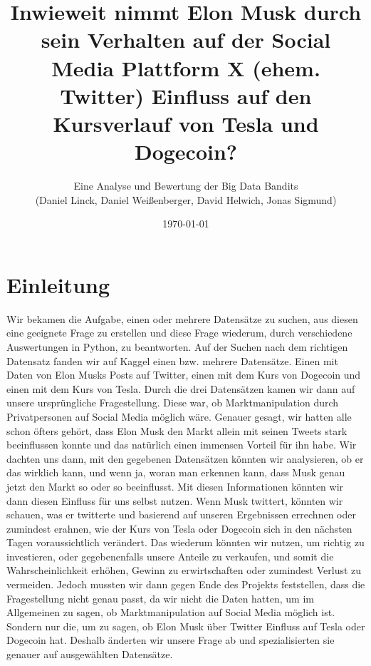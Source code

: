 \documentclass{article}
\title{\textbf {Inwieweit nimmt Elon Musk durch sein Verhalten auf der Social Media Plattform X (ehem. Twitter) Einfluss auf den Kursverlauf von Tesla und Dogecoin?}}
\author{Eine Analyse und Bewertung der Big Data Bandits \\ (Daniel Linck, Daniel Weißenberger, David Helwich, Jonas Sigmund)}
\date{\today}
\begin{document}
\maketitle

\tableofcontents

\section{Einleitung}
Wir bekamen die Aufgabe, einen oder mehrere Datensätze zu suchen, aus diesen eine geeignete Frage zu erstellen und diese Frage wiederum, durch verschiedene Auswertungen in Python, zu beantworten. Auf der Suchen nach dem richtigen Datensatz fanden wir auf Kaggel einen bzw. mehrere Datensätze. Einen mit Daten von Elon Musks Posts auf Twitter, einen mit dem Kurs von Dogecoin und einen mit dem Kurs von Tesla. Durch die drei Datensätzen kamen wir dann auf unsere ursprüngliche Fragestellung. Diese war, ob Marktmanipulation durch Privatpersonen auf Social Media möglich wäre. Genauer gesagt, wir hatten alle schon öfters gehört, dass Elon Musk den Markt allein mit seinen Tweets stark beeinflussen konnte und das natürlich einen immensen Vorteil für ihn habe. Wir dachten uns dann, mit den gegebenen Datensätzen könnten wir analysieren, ob er das wirklich kann, und wenn ja, woran man erkennen kann, dass Musk genau jetzt den Markt so oder so beeinflusst. Mit diesen Informationen könnten wir dann diesen Einfluss für uns selbst nutzen. Wenn Musk twittert, könnten wir schauen, was er twitterte und basierend auf unseren Ergebnissen errechnen oder zumindest erahnen, wie der Kurs von Tesla oder Dogecoin sich in den nächsten Tagen voraussichtlich verändert. Das wiederum könnten wir nutzen, um richtig zu investieren, oder gegebenenfalls unsere Anteile zu verkaufen, und somit die Wahrscheinlichkeit erhöhen, Gewinn zu erwirtschaften oder zumindest Verlust zu vermeiden. Jedoch mussten wir dann gegen Ende des Projekts feststellen, dass die Fragestellung nicht genau passt, da wir nicht die Daten hatten, um im Allgemeinen zu sagen, ob Marktmanipulation auf Social Media möglich ist. Sondern nur die, um zu sagen, ob Elon Musk über Twitter Einfluss auf Tesla oder Dogecoin hat. Deshalb änderten wir unsere Frage ab und spezialisierten sie genauer auf ausgewählten Datensätze.

\newpage
\end{document}
